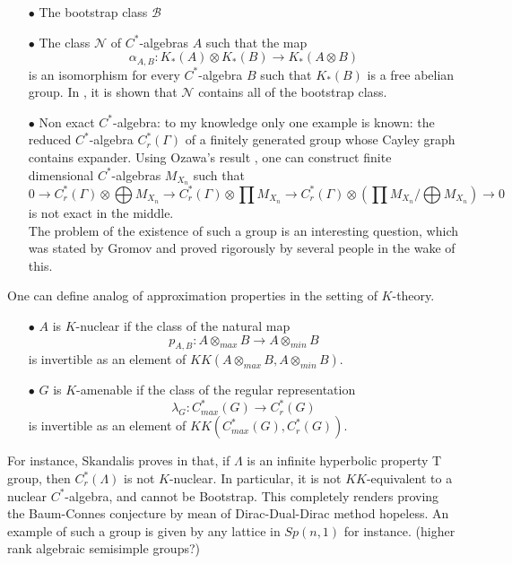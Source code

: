 \begin{itemize}
\item[$\bullet$] The bootstrap class $\mathcal B$ \\
\item[$\bullet$] The class $\mathcal N$ of $C^*$-algebras $A$ such that the map 
\[\alpha_{A,B}: K_*(A)\otimes K_*(B) \rightarrow K_*(A \otimes B)\]
is an isomorphism for every $C^*$-algebra $B$ such that $K_*(B)$ is a free abelian group. In \cite{schochetRosenberg}, it is shown that $\mathcal N$ contains all of the bootstrap class.\\
\item[$\bullet$] Non exact $C^*$-algebra: to my knowledge only one example is known: the reduced $C^*$-algebra $C_r^*(\Gamma) $ of a finitely generated group whose Cayley graph contains expander. Using Ozawa's result \cite{Ozawa}, one can construct finite dimensional $C^*$-algebras $M_{X_n}$ such that 
\[ 0 \rightarrow C_r^*(\Gamma) \otimes \bigoplus M_{X_n} \rightarrow C_r^*(\Gamma) \otimes \prod M_{X_n} \rightarrow C_r^*(\Gamma) \otimes \left(\prod M_{X_n} /  \bigoplus M_{X_n} \right) \rightarrow 0\] is not exact in the middle.\\ The problem of the existence of such a group is an interesting question, which was stated by Gromov and proved rigorously by several people in the wake of this.\\	
\end{itemize}

One can define analog of approximation properties in the setting of $K$-theory. \\

\begin{itemize}
\item[$\bullet$] $A$ is $K$-nuclear if the class of the natural map
\[ p_{A,B} : A\otimes_{max} B \rightarrow A\otimes_{min} B \]
is invertible as an element of $KK(A\otimes_{max} B,A\otimes_{min} B)$.\\
\item[$\bullet$] $G$ is $K$-amenable if the class of the regular representation
\[ \lambda_{G} : C_{max}^*(G) \rightarrow C_{r}^*(G) \]
is invertible as an element of $KK(C_{max}^*(G),C_{r}^*(G))$.\\
\end{itemize}

For instance, Skandalis proves in \cite{SkandalisNotion} that, if $\Lambda$ is an infinite hyperbolic property T group, then $C_r^*(\Lambda)$ is not $K$-nuclear. In particular, it is not $KK$-equivalent to a nuclear $C^*$-algebra, and cannot be Bootstrap. This completely renders proving the Baum-Connes conjecture by mean of Dirac-Dual-Dirac method hopeless. An example of such a group is given by any lattice in $Sp(n,1)$ for instance. (higher rank algebraic semisimple groups?) \\

